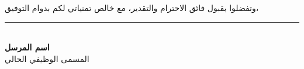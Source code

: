 \documentclass[12pt,a4paper]{article}
\begin{document}
\vspace{0.5em}
\begin{flushright}
وتفضلوا بقبول فائق الاحترام والتقدير، مع خالص تمنياتي لكم بدوام التوفيق،
\end{flushright}

\vspace{2em}

\begin{flushright}
\rule{5cm}{0.4pt}\\[0.3em]
\textbf{اسم المرسل}\\[0.2em]
المسمى الوظيفي الحالي\\[0.2em]
 \,\textbar\, 
\end{flushright}
\end{document}

